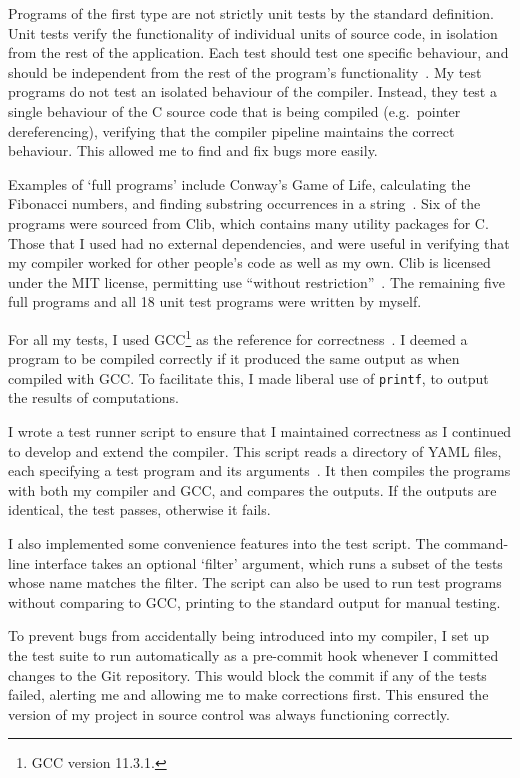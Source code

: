\documentclass[00-main.tex]{subfiles}
\begin{document}
Programs of the first type are not strictly unit tests by the standard definition.
Unit tests verify the functionality of individual units of source code, in isolation from the rest of the application.
Each test should test one specific behaviour, and should be independent from the rest of the program's functionality~.
My test programs do not test an isolated behaviour of the compiler.
Instead, they test a single behaviour of the C source code that is being compiled (e.g.~pointer dereferencing), verifying that the compiler pipeline maintains the correct behaviour.
This allowed me to find and fix bugs more easily.

Examples of `full programs' include Conway's Game of Life, calculating the Fibonacci numbers, and finding substring occurrences in a string~.
Six of the programs were sourced from Clib, which contains many utility packages for C. Those that I used had no external dependencies, and were useful in verifying that my compiler worked for other people's code as well as my own. Clib is licensed under the MIT license, permitting use ``without restriction''~.
The remaining five full programs and all 18 unit test programs were written by myself.

For all my tests, I used GCC\footnote{GCC version 11.3.1.} as the reference for correctness~.
I deemed a program to be compiled correctly if it produced the same output as when compiled with GCC\@.
To facilitate this, I made liberal use of \texttt{printf}, to output the results of computations.

I wrote a test runner script to ensure that I maintained correctness as I continued to develop and extend the compiler.
This script reads a directory of YAML files, each specifying a test program and its arguments~.
It then compiles the programs with both my compiler and GCC, and compares the outputs.
If the outputs are identical, the test passes, otherwise it fails.

I also implemented some convenience features into the test script.
The command-line interface takes an optional `filter' argument, which runs a subset of the tests whose name matches the filter.
The script can also be used to run test programs without comparing to GCC, printing to the standard output for manual testing.

To prevent bugs from accidentally being introduced into my compiler, I set up the test suite to run automatically as a pre-commit hook whenever I committed changes to the Git repository.
This would block the commit if any of the tests failed, alerting me and allowing me to make corrections first.
This ensured the version of my project in source control was always functioning correctly.
\end{document}
